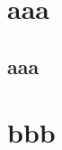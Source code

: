 \documentclass[oneside]{article}
\begin{document}
\section{aaa}
\lipsum
\newpage
\mbox{}
\newpage
\subsection{aaa}
\lipsum
\section{bbb}
\lipsum
\end{document}
